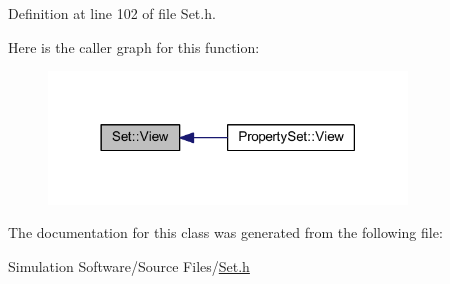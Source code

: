 Definition at line 102 of file Set.\+h.

Here is the caller graph for this function\+:
\nopagebreak
\begin{figure}[H]
\begin{center}
\leavevmode
\includegraphics[width=270pt]{class_set_af64cceb23979b91751faef3a05c9f698_icgraph}
\end{center}
\end{figure}


The documentation for this class was generated from the following file\+:\begin{DoxyCompactItemize}
\item 
Simulation Software/\+Source Files/\hyperlink{_set_8h}{Set.\+h}\end{DoxyCompactItemize}
